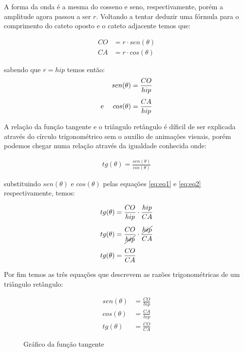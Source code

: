 \begin{multicols*}{2}
    A forma da onda é a mesma do cosseno e seno, respectivamente, porém a
    amplitude agora passou a ser $r$. Voltando a tentar deduzir uma fórmula para
    o comprimento do cateto oposto e o cateto adjacente temos que:

    \begin{align}
        CO & = r\cdot sen(\theta) \\
        CA & = r\cdot cos(\theta)
    \end{align}

    \noindent sabendo que $r=hip$ temos então:
    \begin{align}
        sen(\theta)                & = \frac{CO}{hip} \label{eq:eq1} \\[1ex]
        \text{e \quad} cos(\theta) & = \frac{CA}{hip} \label{eq:eq2}
    \end{align}

    A relação da função tangente e o triângulo retângulo é díficil de ser
    explicada através do círculo trigonométrico sem o auxilio de animações visuais,
    porém podemos chegar numa relação através da igualdade conhecida onde:

    \begin{align*}
        tg(\theta) = \frac{sen(\theta)}{cos(\theta)}
    \end{align*}

    \noindent substituindo $sen(\theta)$ e $cos(\theta)$ pelas equações
    \eqref{eq:eq1} e \eqref{eq:eq2} respectivamente, temos:

    \begin{align}
        tg(\theta) & = \frac{CO}{hip}\cdot\frac{hip}{CA}                   \\[1ex]
        tg(\theta) & = \frac{CO}{\cancel{hip}}\cdot\frac{\cancel{hip}}{CA} \\[1ex]
        tg(\theta) & = \frac{CO}{CA}
    \end{align}

    Por fim temos as três equações que descrevem as razões trigonométricas de um
    triângulo retângulo:

    \begin{align}
        sen(\theta) & = \frac{CO}{hip} \\[1ex]
        cos(\theta) & = \frac{CA}{hip} \\[1ex]
        tg(\theta)  & = \frac{CO}{CA}
    \end{align}

    \begin{figure}[H]
        \centering
        \caption{Gráfico da função tangente}
    \end{figure}


\end{multicols*}
